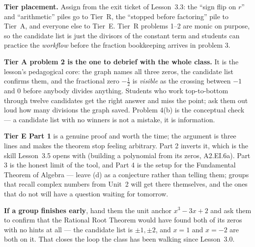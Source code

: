 \documentclass[10pt]{article}
\begin{document}
\begin{teachernote}
\textbf{Tier placement.} Assign from the exit ticket of Lesson~3.3: the ``sign flip on $r$'' and
``arithmetic'' piles go to Tier~R, the ``stopped before factoring'' pile to Tier~A, and everyone else
to Tier~E. Tier~R problems 1--2 are monic on purpose, so the candidate list is just the divisors of
the constant term and students can practice the \emph{workflow} before the fraction bookkeeping
arrives in problem 3.

\vspace{3pt}
\textbf{Tier A problem 2 is the one to debrief with the whole class.} It is the lesson's pedagogical
core: the graph names all three zeros, the candidate list confirms them, and the fractional zero
$-\tfrac12$ is \emph{visible} as the crossing between $-1$ and $0$ before anybody divides anything.
Students who work top-to-bottom through twelve candidates get the right answer and miss the point;
ask them out loud how many divisions the graph saved. Problem 4(b) is the conceptual check --- a
candidate list with no winners is not a mistake, it is information.

\vspace{3pt}
\textbf{Tier E Part 1} is a genuine proof and worth the time; the argument is three lines and makes
the theorem stop feeling arbitrary. Part 2 inverts it, which is the skill Lesson~3.5 opens with
(building a polynomial from its zeros, A2.EI.6a). Part 3 is the honest limit of the tool, and Part 4
is the setup for the Fundamental Theorem of Algebra --- leave (d) as a conjecture rather than
telling them; groups that recall complex numbers from Unit~2 will get there themselves, and the ones
that do not will have a question waiting for tomorrow.

\vspace{3pt}
\textbf{If a group finishes early}, hand them the unit anchor $x^3-3x+2$ and ask them to confirm
that the Rational Root Theorem would have found both of its zeros with no hints at all --- the
candidate list is $\pm1,\pm2$, and $x=1$ and $x=-2$ are both on it. That closes the loop the class
has been walking since Lesson~3.0.
\end{teachernote}
\end{document}
